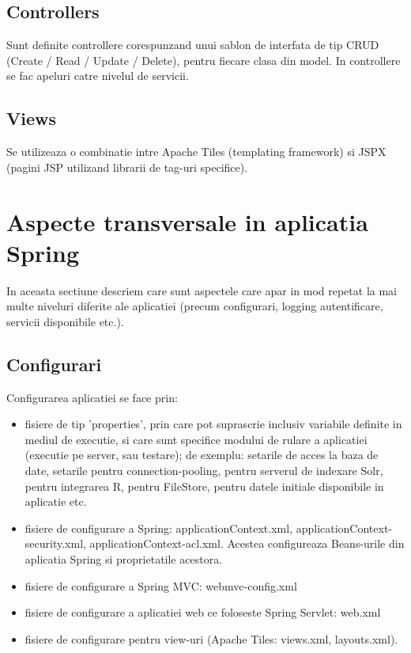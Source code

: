 \subsection{Controllers}
Sunt definite controllere corespunzand unui sablon de interfata de tip CRUD
(Create / Read / Update / Delete), pentru fiecare clasa din model. In
controllere se fac apeluri catre nivelul de servicii.

\subsection{Views}
Se utilizeaza o combinatie intre Apache Tiles (templating framework) si JSPX
(pagini JSP utilizand librarii de tag-uri specifice).

\section{Aspecte transversale in aplicatia Spring}
In aceasta sectiune descriem care sunt aspectele care apar in mod repetat la mai
multe niveluri diferite ale aplicatiei (precum configurari, logging
autentificare, servicii disponibile etc.).

\subsection{Configurari}
Configurarea aplicatiei se face prin:
\begin {itemize}
  \item fisiere de tip 'properties', prin care pot suprascrie
inclusiv variabile definite in mediul de executie, si care sunt specifice modului de rulare a
aplicatiei (executie pe server, sau testare); de exemplu: setarile de acces la
baza de date, setarile pentru connection-pooling, pentru serverul de indexare
Solr, pentru integrarea R, pentru FileStore, pentru datele initiale disponibile
in aplicatie etc.
  \item fisiere de configurare a Spring: applicationContext.xml,
  applicationContext-security.xml, applicationContext-acl.xml. Acestea
  configureaza Beans-urile din aplicatia Spring si proprietatile acestora.
  \item fisiere de configurare a Spring MVC: webmvc-config.xml
  \item fisiere de configurare a aplicatiei web ce foloseste Spring Servlet:
  web.xml
  \item fisiere de configurare pentru view-uri (Apache Tiles: views.xml,
  layouts.xml).
\end{itemize}

